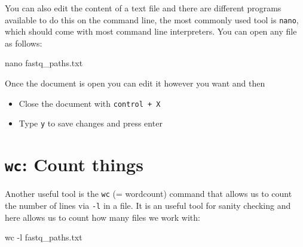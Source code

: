 \documentclass[
  letterpaper,
  DIV=11,
  numbers=noendperiod]{scrreprt}
\newenvironment{Shaded}{}{}
\newcommand{\AttributeTok}[1]{\textcolor[rgb]{0.84,0.23,0.29}{#1}}
\newcommand{\FunctionTok}[1]{\textcolor[rgb]{0.44,0.26,0.76}{#1}}
\newcommand{\NormalTok}[1]{\textcolor[rgb]{0.14,0.16,0.18}{#1}}
\providecommand{\tightlist}{%
  \setlength{\itemsep}{0pt}\setlength{\parskip}{0pt}}\usepackage{longtable,booktabs,array}
\begin{document}
\begin{tcolorbox}[enhanced jigsaw, breakable, left=2mm, title=\textcolor{quarto-callout-tip-color}{\faLightbulb}\hspace{0.5em}{Tip: Editing text files}, opacityback=0, opacitybacktitle=0.6, rightrule=.15mm, bottomrule=.15mm, colback=white, colframe=quarto-callout-tip-color-frame, coltitle=black, bottomtitle=1mm, arc=.35mm, toprule=.15mm, colbacktitle=quarto-callout-tip-color!10!white, toptitle=1mm, titlerule=0mm, leftrule=.75mm]

You can also edit the content of a text file and there are different
programs available to do this on the command line, the most commonly
used tool is \texttt{nano}, which should come with most command line
interpreters. You can open any file as follows:

\begin{Shaded}
\begin{Highlighting}[]
\FunctionTok{nano}\NormalTok{ fastq\_paths.txt}
\end{Highlighting}
\end{Shaded}

Once the document is open you can edit it however you want and then

\begin{itemize}
\tightlist
\item
  Close the document with \texttt{control\ +\ X}
\item
  Type \texttt{y} to save changes and press enter
\end{itemize}

\end{tcolorbox}

\section{\texorpdfstring{\texttt{wc}: Count
things}{wc: Count things}}\label{wc-count-things}

Another useful tool is the \texttt{wc} (= wordcount) command that allows
us to count the number of lines via \texttt{-l} in a file. It is an
useful tool for sanity checking and here allows us to count how many
files we work with:

\begin{Shaded}
\begin{Highlighting}[]
\FunctionTok{wc} \AttributeTok{{-}l}\NormalTok{ fastq\_paths.txt}
\end{Highlighting}
\end{Shaded}
\end{document}
